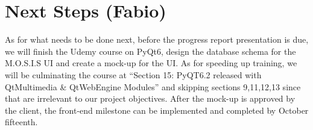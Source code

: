 \section{Next Steps (Fabio)}
As for what needs to be done next, before the progress report presentation is due, we will finish the Udemy course on PyQt6, design the database schema for the M.O.S.I.S UI and create a mock-up for the UI. As for speeding up training, we will be culminating the course at ``Section 15: PyQT6.2 released with QtMultimedia & QtWebEngine Modules'' and skipping sections 9,11,12,13 since that are irrelevant to our project objectives. After the mock-up is approved by the client, the front-end milestone can be implemented and completed by October fifteenth.